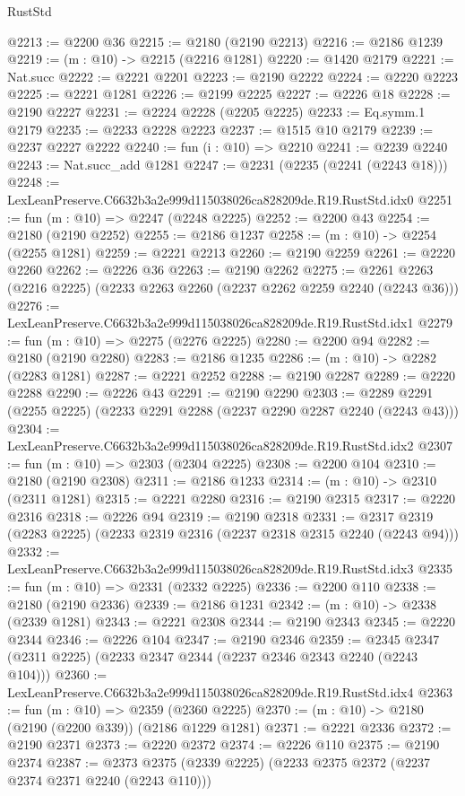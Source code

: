 \begin{lexlean}{RustStd}
\begin{coremodule}
@2213 := @2200 @36
@2215 := @2180 (@2190 @2213)
@2216 := @2186 @1239
@2219 := (m : @10) -> @2215 (@2216 @1281)
@2220 := @1420 @2179
@2221 := Nat.succ
@2222 := @2221 @2201
@2223 := @2190 @2222
@2224 := @2220 @2223
@2225 := @2221 @1281
@2226 := @2199 @2225
@2227 := @2226 @18
@2228 := @2190 @2227
@2231 := @2224 @2228 (@2205 @2225)
@2233 := Eq.symm.{1} @2179
@2235 := @2233 @2228 @2223
@2237 := @1515 @10 @2179
@2239 := @2237 @2227 @2222
@2240 := fun (i : @10) => @2210
@2241 := @2239 @2240
@2243 := Nat.succ_add @1281
@2247 := @2231 (@2235 (@2241 (@2243 @18)))
@2248 := LexLeanPreserve.C6632b3a2e999d115038026ca828209de.R19.RustStd.idx0
@2251 := fun (m : @10) => @2247 (@2248 @2225)
@2252 := @2200 @43
@2254 := @2180 (@2190 @2252)
@2255 := @2186 @1237
@2258 := (m : @10) -> @2254 (@2255 @1281)
@2259 := @2221 @2213
@2260 := @2190 @2259
@2261 := @2220 @2260
@2262 := @2226 @36
@2263 := @2190 @2262
@2275 := @2261 @2263 (@2216 @2225) (@2233 @2263 @2260 (@2237 @2262 @2259 @2240 (@2243 @36)))
@2276 := LexLeanPreserve.C6632b3a2e999d115038026ca828209de.R19.RustStd.idx1
@2279 := fun (m : @10) => @2275 (@2276 @2225)
@2280 := @2200 @94
@2282 := @2180 (@2190 @2280)
@2283 := @2186 @1235
@2286 := (m : @10) -> @2282 (@2283 @1281)
@2287 := @2221 @2252
@2288 := @2190 @2287
@2289 := @2220 @2288
@2290 := @2226 @43
@2291 := @2190 @2290
@2303 := @2289 @2291 (@2255 @2225) (@2233 @2291 @2288 (@2237 @2290 @2287 @2240 (@2243 @43)))
@2304 := LexLeanPreserve.C6632b3a2e999d115038026ca828209de.R19.RustStd.idx2
@2307 := fun (m : @10) => @2303 (@2304 @2225)
@2308 := @2200 @104
@2310 := @2180 (@2190 @2308)
@2311 := @2186 @1233
@2314 := (m : @10) -> @2310 (@2311 @1281)
@2315 := @2221 @2280
@2316 := @2190 @2315
@2317 := @2220 @2316
@2318 := @2226 @94
@2319 := @2190 @2318
@2331 := @2317 @2319 (@2283 @2225) (@2233 @2319 @2316 (@2237 @2318 @2315 @2240 (@2243 @94)))
@2332 := LexLeanPreserve.C6632b3a2e999d115038026ca828209de.R19.RustStd.idx3
@2335 := fun (m : @10) => @2331 (@2332 @2225)
@2336 := @2200 @110
@2338 := @2180 (@2190 @2336)
@2339 := @2186 @1231
@2342 := (m : @10) -> @2338 (@2339 @1281)
@2343 := @2221 @2308
@2344 := @2190 @2343
@2345 := @2220 @2344
@2346 := @2226 @104
@2347 := @2190 @2346
@2359 := @2345 @2347 (@2311 @2225) (@2233 @2347 @2344 (@2237 @2346 @2343 @2240 (@2243 @104)))
@2360 := LexLeanPreserve.C6632b3a2e999d115038026ca828209de.R19.RustStd.idx4
@2363 := fun (m : @10) => @2359 (@2360 @2225)
@2370 := (m : @10) -> @2180 (@2190 (@2200 @339)) (@2186 @1229 @1281)
@2371 := @2221 @2336
@2372 := @2190 @2371
@2373 := @2220 @2372
@2374 := @2226 @110
@2375 := @2190 @2374
@2387 := @2373 @2375 (@2339 @2225) (@2233 @2375 @2372 (@2237 @2374 @2371 @2240 (@2243 @110)))

\end{coremodule}
\end{lexlean}
